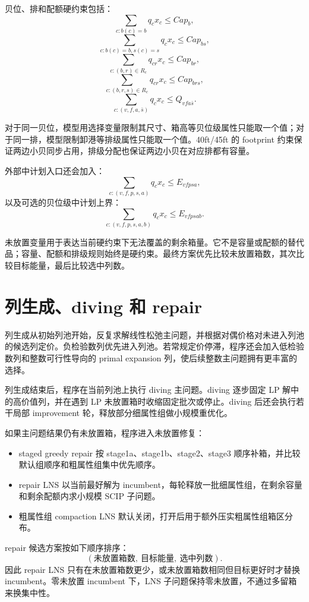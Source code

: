\documentclass[UTF8,a4paper,11pt]{ctexart}
\begin{document}
贝位、排和配额硬约束包括：
\[
\sum_{c:b(c)=b} q_cx_c \le Cap_b,
\]
\[
\sum_{c:b(c)=b,s(c)=s} q_cx_c \le Cap_{bs},
\]
\[
\sum_{c:(b,r)\in R_c} q_{cr}x_c \le Cap_{br},
\]
\[
\sum_{c:(b,r,s)\in R_c} q_{cr}x_c \le Cap_{brs},
\]
\[
\sum_{c:(v,f,a,\bar{s})} q_cx_c \le Q_{vfa\bar{s}}.
\]

对于同一贝位，模型用选择变量限制其尺寸、箱高等贝位级属性只能取一个值；对于同一排，模型限制卸港等排级属性只能取一个值。40ft/45ft 的 footprint 约束保证两边小贝同步占用，排级分配也保证两边小贝在对应排都有容量。

外部中计划入口还会加入：
\[
\sum_{c:(v,f,p,s,a)}q_cx_c\le E_{vfpsa},
\]
以及可选的贝位级中计划上界：
\[
\sum_{c:(v,f,p,s,a,b)}q_cx_c\le E_{vfpsab}.
\]

未放置变量用于表达当前硬约束下无法覆盖的剩余箱量。它不是容量或配额的替代品；容量、配额和排级规则始终是硬约束。最终方案优先比较未放置箱数，其次比较目标能量，最后比较选中列数。

\section{列生成、diving 和 repair}

列生成从初始列池开始，反复求解线性松弛主问题，并根据对偶价格对未进入列池的候选列定价。负检验数列优先进入列池。若常规定价停滞，程序还会加入低检验数列和整数可行性导向的 primal expansion 列，使后续整数主问题拥有更丰富的选择。

列生成结束后，程序在当前列池上执行 diving 主问题。diving 逐步固定 LP 解中的高价值列，并在遇到 LP 未放置箱时收缩固定批次或停止。diving 后还会执行若干局部 improvement 轮，释放部分细属性组做小规模重优化。

如果主问题结果仍有未放置箱，程序进入未放置修复：
\begin{itemize}
  \item staged greedy repair 按 stage1a、stage1b、stage2、stage3 顺序补箱，并比较默认组顺序和粗属性组集中优先顺序。
  \item repair LNS 以当前最好解为 incumbent，每轮释放一批细属性组，在剩余容量和剩余配额内求小规模 SCIP 子问题。
  \item 粗属性组 compaction LNS 默认关闭，打开后用于额外压实粗属性组箱区分布。
\end{itemize}

repair 候选方案按如下顺序排序：
\[
(\text{未放置箱数},\ \text{目标能量},\ \text{选中列数}).
\]
因此 repair LNS 只有在未放置箱数更少，或未放置箱数相同但目标更好时才替换 incumbent。零未放置 incumbent 下，LNS 子问题保持零未放置，不通过多留箱来换集中性。
\end{document}
